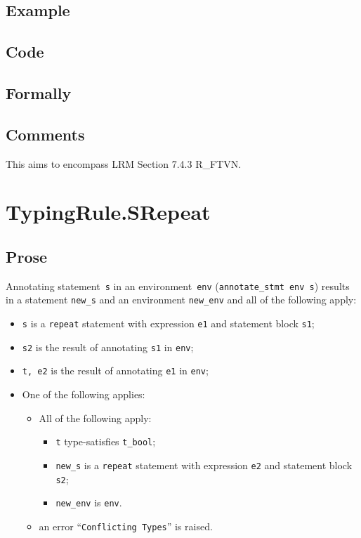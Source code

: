 \documentclass{book}
\begin{document}
  \subsection{Example}

  \subsection{Code}

\begin{emptyformal}
    \subsection{Formally}
\end{emptyformal}

\subsection{Comments}
    This aims to encompass LRM Section 7.4.3 R\_FTVN.

\section{TypingRule.SRepeat \label{sec:TypingRule.SRepeat}}

  \subsection{Prose}
Annotating statement~\texttt{s} in an environment~\texttt{env}
(\texttt{annotate\_stmt env s}) results in a statement \texttt{new\_s} and an
environment \texttt{new\_env} and all of the following apply:
   \begin{itemize}
   \item \texttt{s} is a \texttt{repeat} statement with expression \texttt{e1} and statement block \texttt{s1};
   \item \texttt{s2} is the result of annotating \texttt{s1} in \texttt{env};
   \item \texttt{t, e2} is the result of annotating \texttt{e1} in \texttt{env};
   \item One of the following applies:
     \begin{itemize}
     \item All of the following apply:
       \begin{itemize}
       \item \texttt{t} type-satisfies \texttt{t\_bool};
       \item \texttt{new\_s} is a \texttt{repeat} statement with expression \texttt{e2} and statement block \texttt{s2};
       \item \texttt{new\_env} is \texttt{env}.
       \end{itemize}
     \item an error ``\texttt{Conflicting Types}'' is raised.
     \end{itemize}
   \end{itemize}
\end{document}
